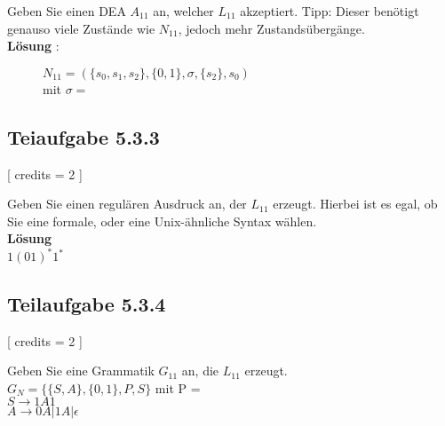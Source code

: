 \documentclass[12pt]{article}
\begin{document}
 Geben Sie einen DEA $A_{11}$ an, welcher $L_{11}$ akzeptiert. Tipp: Dieser benötigt genauso viele Zustände wie $N_{11}$, jedoch mehr Zustandsübergänge. \\
 \textbf{Lösung} :   
 \begin{figure}[h] 
   $N_{11} = (\{s_0,s_1,s_2\},\{0,1\},\sigma,\{s_2\},s_0)$ \\ mit $\sigma =$ \\

 \centering 
  
 \end{figure} 
  
  
  
  
 \subsection*{Teiaufgabe 5.3.3} [
 credits = 2 
 ] 
  
 Geben Sie einen regulären Ausdruck an, der $L_{11}$ erzeugt. Hierbei ist es egal, ob Sie eine formale, oder eine Unix-ähnliche Syntax wählen.  \\
  \textbf{Lösung}\\
  $1(01)^*1^*$
  
  
 \subsection*{Teilaufgabe 5.3.4} [
 credits = 2 
 ] 
  
 Geben Sie eine Grammatik $G_{11}$ an, die $L_{11}$ erzeugt.  \\
  $G_N = \{\{S,A\},\{0,1\},P,S\}$ mit P =\\
 $S \rightarrow 1A1$\\
 $A \rightarrow 0A|1A|\epsilon$
 
\end{document}
